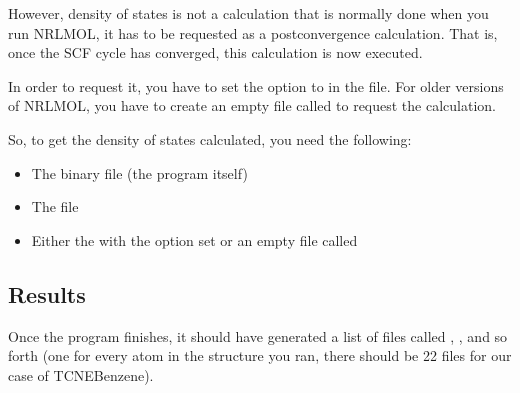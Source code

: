\documentclass[letterpaper,10pt,english,openany,oneside]{sphinxmanual}
\begin{document}
\begin{sphinxVerbatim}[commandchars=\\\{\}]
                        
                       
                       
                        
                      
                       
                 
\end{sphinxVerbatim}

\sphinxAtStartPar
However, density of states is not a calculation that is normally done when you run NRLMOL, it has to be requested as a post\sphinxhyphen{}convergence calculation. That is, once the SCF cycle has converged, this calculation is now executed.

\sphinxAtStartPar
In order to request it, you have to set the option  to  in the  file. For older versions of NRLMOL, you have to create an empty file called  to request the calculation.

\sphinxAtStartPar
So, to get the density of states calculated, you need the following:
\begin{itemize}
\item {} 
\sphinxAtStartPar
The binary file (the program itself)

\item {} 
\sphinxAtStartPar
The  file

\item {} 
\sphinxAtStartPar
Either the  with the option set or an empty file called 

\end{itemize}


\subsection{Results}
\label{\detokenize{tutorials/ddos/density_of_states:results}}
\sphinxAtStartPar
Once the program finishes, it should have generated a list of files called , , and so forth (one for every atom in the structure you ran, there should be 22 files for our case of TCNE\sphinxhyphen{}Benzene).
\end{document}
